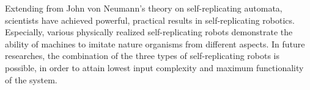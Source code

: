 \documentclass[12pt,twoside]{article}
\theoremstyle{plain}
\theoremstyle{definition}
\theoremstyle{remark}
\begin{document}
Extending from John von Neumann's theory on self-replicating automata, scientists have achieved powerful, practical results in self-replicating robotics. Especially, various physically realized self-replicating robots demonstrate the ability of machines to imitate nature organisms from different aspects. In future researches, the combination of the three types of self-replicating robots is possible, in order to attain lowest input complexity and maximum functionality of the system.

%
%



\end{document}
